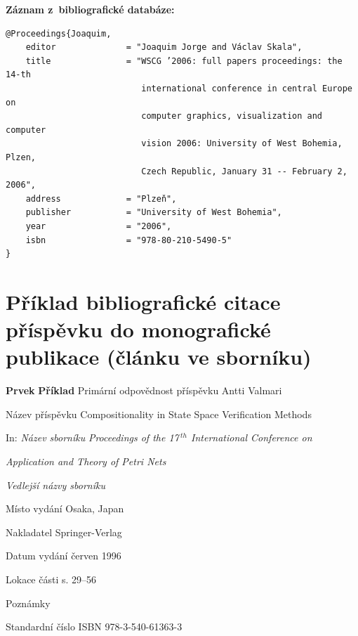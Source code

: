 \bigskip \bigskip
\noindent \textbf{Záznam z~bibliografické databáze:}
\vspace{-0.5em}
\begin{verbatim}
@Proceedings{Joaquim,
    editor              = "Joaquim Jorge and Václav Skala",
    title               = "WSCG ’2006: full papers proceedings: the 14-th 
                           international conference in central Europe on 
                           computer graphics, visualization and computer 
                           vision 2006: University of West Bohemia, Plzen, 
                           Czech Republic, January 31 -- February 2, 2006",
    address             = "Plzeň",
    publisher           = "University of West Bohemia",
    year                = "2006",
    isbn                = "978-80-210-5490-5"
}
\end{verbatim}


\newpage
\section*{Příklad bibliografické citace příspěvku do monografické \\
publikace (článku ve sborníku)} 
\label{pr-sbornik-clanek}
\begin{tabbing}
\zarazky
\textbf{Prvek} \> \textbf{Příklad} \odradkovani
Primární odpovědnost příspěvku \>
Antti {\sc Valmari}

\odradkovani
Název příspěvku \>
Compositionality in State Space Verification Methods

\odradkovani
In: {\em Název sborníku} \>
{\em Proceedings of the 17\,$^{th}$ International Conference on}

   \odradkovani \>
   {\em Application and Theory of Petri Nets}
   
\odradkovani
{\em Vedlejší názvy sborníku}\footnotemark[1]

\odradkovani
Místo vydání \>
Osaka, Japan

\odradkovani
Nakladatel \>
Springer-Verlag

\odradkovani
Datum vydání \>
červen 1996

\odradkovani
Lokace části \>
s. 29--56

\odradkovani
Poznámky\footnotemark[2] \>

\odradkovani
Standardní číslo \>
ISBN 978-3-540-61363-3

\odradkovani
\end{tabbing}

